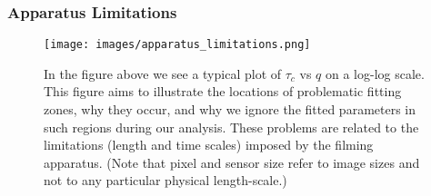\documentclass[10pt]{article}
\begin{document}
\subsubsection{Apparatus Limitations}
\label{section:fitting_issues}
\begin{figure}[H]
\centering
\centerline{\texttt{[image: images/apparatus\_limitations.png]}}
\caption{
In the figure above we see a typical plot of $\tau_c$ vs $q$ on a log-log scale. This figure aims to illustrate the locations of problematic fitting zones, why they occur, and why we ignore the fitted parameters in such regions during our analysis. These problems are related to the limitations (length and time scales) imposed by the filming apparatus. (Note that pixel and sensor size refer to image sizes and not to any particular physical length-scale.)
}
\end{figure}
\end{document}
